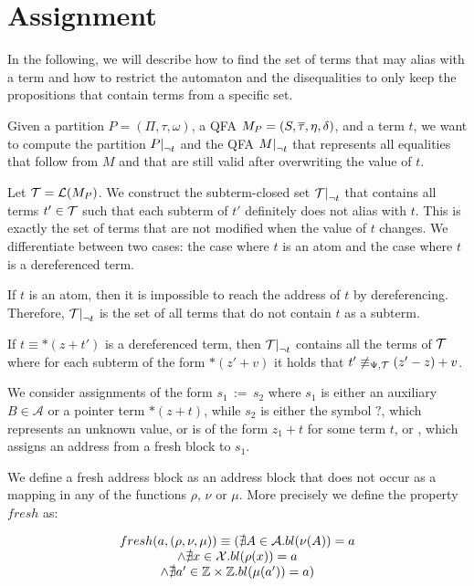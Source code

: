 \section{Assignment}






In the following, we will describe how to find the set of terms that may alias with a term and how to restrict the automaton and the disequalities to only keep the propositions that contain terms from a specific set.

Given a partition $P = (\Pi, \tau, \omega)$, a QFA $M_P = (S, \overline{\tau}, \eta, \delta)$, and a term $t$, we want to compute the partition $\restr{P}{\neg t}$ and the QFA $\restr{M}{\neg t}$ that represents all equalities that follow from $M$ and that are still valid after overwriting the value of $t$.

Let $\mathcal{T} = \mathcal{L}(M_P)$. We construct the subterm-closed set $\restr{\T}{\neg t}$ that contains all terms $t' \in \mathcal{T}$ such that each subterm of $t'$ definitely does not alias with $t$.
This is exactly the set of terms that are not modified when the value of $t$ changes.
We differentiate between two cases: the case where $t$ is an atom and the case where $t$ is a dereferenced term.

If $t$ is an atom, then it is impossible to reach the address of $t$ by dereferencing.
Therefore, $\restr{\T}{\neg t}$ is the set of all terms that do not contain $t$ as a subterm.

If $t \equiv *(z + t')$ is a dereferenced term, then $\restr{\T}{\neg t}$ contains all the terms of $\mathcal{T}$ where for each subterm of the form $*(z' + v)$ it holds that $t' \not\equiv_{\Psi,\mathcal{T}} (z' - z) + v$.

We consider assignments of the form $s_1\,{:=}\,s_2$ where $s_1$ is either an auxiliary $B \in \mathcal{A}$ or a pointer term $*(z+t)$, while $s_2$ is either the symbol $?$, which represents an unknown value, or is of the form $z_1 + t$ for some term $t$, or \malloc, which assigns an address from a fresh block to $s_1$.

We define a fresh address block as an address block that does not occur as a mapping in any of the functions $\rho$, $\nu$ or $\mu$. More precisely we define the property $fresh$ as:

\[ \begin{array}{c}
		fresh(a, (\rho,\nu,\mu)) \equiv
		(\nexists A\in \mathcal{A} . bl(\nu(A)) = a     \\
		\land \nexists x\in \mathcal{X}. bl(\rho(x)) = a \\
		\land \nexists a'\in \mathbb{Z} \times \mathbb{Z} . bl(\mu(a')) = a)
	\end{array}
\]

